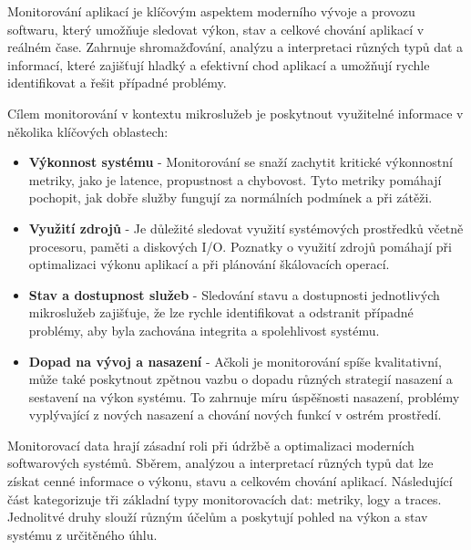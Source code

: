 


Monitorování aplikací je klíčovým aspektem moderního vývoje a provozu softwaru, který umožňuje sledovat výkon, stav a celkové chování aplikací v reálném čase. Zahrnuje shromažďování, analýzu a interpretaci různých typů dat a informací, které zajišťují hladký a efektivní chod aplikací a umožňují rychle identifikovat a řešit případné problémy. \cite{Majors2022}


Cílem monitorování v kontextu mikroslužeb je poskytnout využitelné informace v několika klíčových oblastech:

\begin {itemize}
    \item \textbf{Výkonnost systému} - Monitorování se snaží zachytit kritické výkonnostní metriky, jako je latence, propustnost a chybovost. Tyto metriky pomáhají pochopit, jak dobře služby fungují za normálních podmínek a při zátěži.
    \item \textbf{Využití zdrojů} - Je důležité sledovat využití systémových prostředků včetně procesoru, paměti a diskových I/O. Poznatky o využití zdrojů pomáhají při optimalizaci výkonu aplikací a při plánování škálovacích operací.
    \item \textbf{Stav a dostupnost služeb} - Sledování stavu a dostupnosti jednotlivých mikroslužeb zajišťuje, že lze rychle identifikovat a odstranit případné problémy, aby byla zachována integrita a spolehlivost systému.
    \item \textbf{Dopad na vývoj a nasazení} - Ačkoli je monitorování spíše kvalitativní, může také poskytnout zpětnou vazbu o dopadu různých strategií nasazení a sestavení na výkon systému. To zahrnuje míru úspěšnosti nasazení, problémy vyplývající z nových nasazení a chování nových funkcí v ostrém prostředí.
\end{itemize}


Monitorovací data hrají zásadní roli při údržbě a optimalizaci moderních softwarových systémů. Sběrem, analýzou a interpretací různých typů dat lze získat cenné informace o výkonu, stavu a celkovém chování aplikací. Následující část kategorizuje tři základní typy monitorovacích dat: metriky, logy a traces. Jednolitvé druhy slouží různým účelům a poskytují pohled na výkon a stav systému z určitěného úhlu. \cite{Blanco2023}

